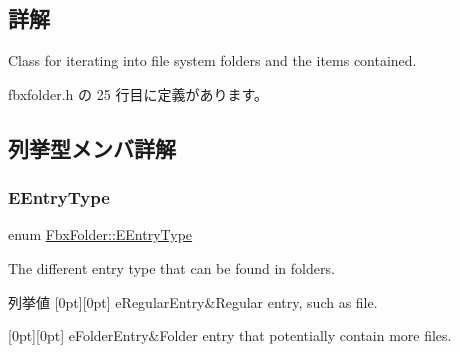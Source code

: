 \subsection{詳解}
Class for iterating into file system folders and the items contained. 

 fbxfolder.\+h の 25 行目に定義があります。



\subsection{列挙型メンバ詳解}
\mbox{\label{class_fbx_folder_aba9ef5b806b138dec254dfe5dedbb719}} 
\subsubsection{\texorpdfstring{E\+Entry\+Type}{EEntryType}}
{\footnotesize\ttfamily enum \hyperlink{class_fbx_folder_aba9ef5b806b138dec254dfe5dedbb719}{Fbx\+Folder\+::\+E\+Entry\+Type}}



The different entry type that can be found in folders. 

\begin{DoxyEnumFields}{列挙値}
[0pt][0pt]{}\mbox{\label{class_fbx_folder_aba9ef5b806b138dec254dfe5dedbb719a5e6793b9289c6aecd4cf50a6e19bbee5}} 
e\+Regular\+Entry&Regular entry, such as file. \\
\hline

[0pt][0pt]{}\mbox{\label{class_fbx_folder_aba9ef5b806b138dec254dfe5dedbb719a1a78e903f59673df49ba233185e186c9}} 
e\+Folder\+Entry&Folder entry that potentially contain more files. \\
\hline

\end{DoxyEnumFields}


